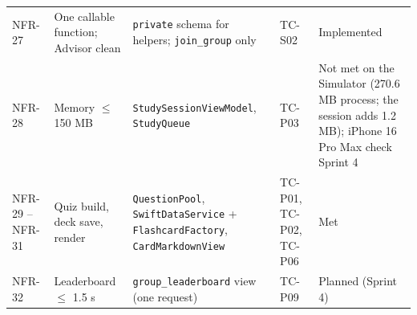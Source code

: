 \documentclass[12pt,letterpaper]{article}
\begin{document}
\begin{xltabular}{\textwidth}{@{}l L{3.2cm} Y l L{2.6cm}@{}}
NFR-27 & One callable function; Advisor clean & \texttt{private} schema for helpers; \texttt{join\_group} only & TC-S02 & Implemented \\
NFR-28 & Memory $\le$ 150 MB & \texttt{StudySessionViewModel}, \texttt{StudyQueue} & TC-P03 & Not met on the Simulator (270.6 MB process; the session adds 1.2 MB); iPhone 16 Pro Max check Sprint 4 \\
NFR-29 -- NFR-31 & Quiz build, deck save, render & \texttt{QuestionPool}, \texttt{SwiftDataService} + \texttt{FlashcardFactory}, \texttt{CardMarkdownView} & TC-P01, TC-P02, TC-P06 & Met \\
NFR-32 & Leaderboard $\le$ 1.5 s & \texttt{group\_leaderboard} view (one request) & TC-P09 & Planned (Sprint 4) \\
\end{xltabular}
\end{document}
